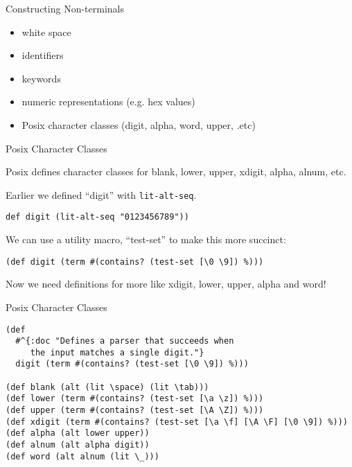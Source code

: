 \documentclass[presentation]{beamer}
\begin{document}
\begin{frame}{Constructing Non-terminals}
\begin{itemize}
\item white space
\item identifiers
\item keywords
\item numeric representations (e.g. hex values)
\item Posix character classes (digit, alpha, word, upper, .etc)
\end{itemize}
\end{frame}

\begin{frame}[fragile]{Posix Character Classes}

 Posix defines character classes for blank, lower, upper,
 xdigit, alpha, alnum, etc.

 Earlier we defined ``digit''  with \texttt{lit-alt-seq}.

\begin{verbatim}
def digit (lit-alt-seq "0123456789"))
\end{verbatim}

We can use a utility macro, ``test-set'' to make this more
succinct:

\begin{verbatim}
(def digit (term #(contains? (test-set [\0 \9]) %)))
\end{verbatim}

Now we need definitions for more like xdigit, lower, upper, alpha and
word!
\end{frame}

\begin{frame}[fragile]{Posix Character Classes}


\begin{verbatim}
(def
  #^{:doc "Defines a parser that succeeds when
     the input matches a single digit."}
  digit (term #(contains? (test-set [\0 \9]) %)))

(def blank (alt (lit \space) (lit \tab)))
(def lower (term #(contains? (test-set [\a \z]) %)))
(def upper (term #(contains? (test-set [\A \Z]) %)))
(def xdigit (term #(contains? (test-set [\a \f] [\A \F] [\0 \9]) %)))
(def alpha (alt lower upper))
(def alnum (alt alpha digit))
(def word (alt alnum (lit \_)))
\end{verbatim}

\end{frame}
\end{document}
